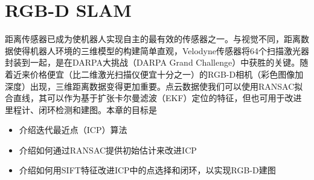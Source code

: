 

\chapter{RGB-D SLAM} 
\label{rgbd-slam}

距离传感器已成为使机器人实现自主的最有效的传感器之一。与视觉不同，距离数据使得机器人环境的三维模型的构建简单直观，Velodyne传感器将64个扫描激光器封装到一起，是在DARPA大挑战（DARPA Grand Challenge）中获胜的关键。随着近来价格便宜（比二维激光扫描仪便宜十分之一）的RGB-D相机（彩色图像加深度）出现，三维距离数据变得更加重要。点云数据使我们可以使用RANSAC拟合直线，其可以作为基于扩张卡尔曼滤波（EKF）定位的特征，但也可用于改进里程计、闭环检测和建图。本章的目标是

\begin{itemize}

\item 介绍迭代最近点（ICP）算法
\item 介绍如何通过RANSAC提供初始估计来改进ICP
\item 介绍如何用SIFT特征改进ICP中的点选择和闭环，以实现RGB-D建图
\end{itemize}


